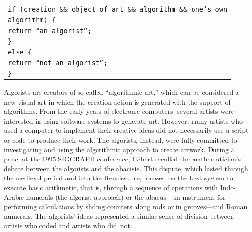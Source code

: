 \medskip
{
\begin{tabular}{|l|}
\hline
\texttt{if (creation \&\& object of art \&\& algorithm \&\& one's own} \\
\texttt{algorithm) \{}\\
\quad \texttt{return ``an algorist'';}\\
\quad \texttt{\}}\\
\quad \texttt{else \{}\\
\quad \texttt{return ``not an algorist'';}\\
\quad \texttt{\}} \\
\hline
\end{tabular}}

\medskip
Algorists are creators of so-called ``algorithmic art,'' which can be considered a new visual art in which the creation action is generated with the support of algorithms. From the early years of electronic computers, several artists were interested in using software systems to generate art. However, many artists who used a computer to implement their creative ideas did not necessarily use a script or code to produce their work. The algorists, instead, were fully committed to investigating and using the algorithmic approach to create artwork. During a panel at the 1995 SIGGRAPH conference, H\'{e}bert recalled the mathematician's debate between the algorists and the abacists. This \hbox{dispute}, which lasted through the medieval period and into the Renaissance, focused on the best system to execute basic arithmetic, that is, through a sequence of operations with Indo-Arabic numerals (the algorist approach) or the abacus---an instrument for performing calculations by sliding counters along rods or in grooves---and Roman numerals. The algorists' ideas represented a similar sense of division between artists who coded and artists who \hbox{did not.}

